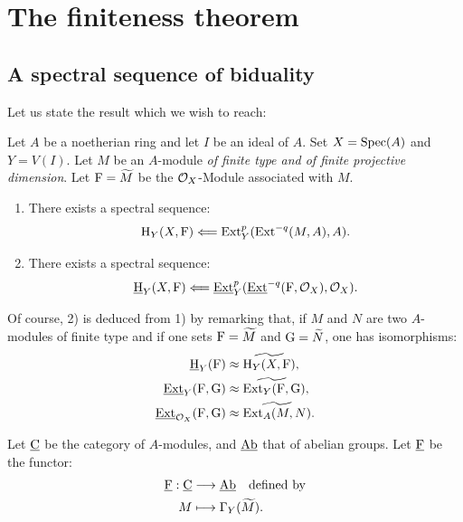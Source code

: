 \chapter{The finiteness theorem} \label{VIII}

\section[A spectral sequence of biduality]
{A spectral sequence of biduality\protect\sfootnotemark}\label{VIII.1}

\renewcommand{\theequation}{\thesection.\arabic{equation}}

Let us state the result which we wish to reach:

\begin{proposition} \label{VIII.1.1} Let $A$ be a noetherian ring and let $I$ be an ideal of $A$. Set $X=\operatorname{Spec}(A)$ and $Y=V(I)$. Let $M$ be an $A$-module \emph{of finite type and of finite projective dimension}. Let ${\operatorname{F}}=\widetilde{M}$ be the $\mathcal{O}_X$-Module associated with $M$.
\begin{enumerate}
\item[\textup{1)}] There exists a spectral sequence:
\[
\operatorname{H}_Y(X, {\operatorname{F}}) \Longleftarrow \operatorname{Ext}^p_Y(\operatorname{Ext}^{-q}(M, A), A).
\]

\item[\textup{2)}] There exists a spectral sequence:
\[
\operatorname{\underline{H}}_Y(X, {\operatorname{F}}) \Longleftarrow \operatorname{\underline{Ext}}^p_Y(\operatorname{\underline{Ext}}^{-q}({\operatorname{F}}, \mathcal{O}_X), \mathcal{O}_X).
\]
\end{enumerate}
\end{proposition}

Of course, 2) is deduced from 1) by remarking that, if $M$ and $N$ are two $A$-modules of finite type and if one sets ${{\operatorname{F}}}=\widetilde{M}$ and ${{\operatorname{G}}}=\widetilde{N}$, one has isomorphisms:
\begin{align*}
\operatorname{\underline{H}}_Y({\operatorname{F}}) &\approx \widetilde{\operatorname{H}_Y(X, {\operatorname{F}})}, \\
\operatorname{\underline{Ext}}_Y({\operatorname{F}}, {\operatorname{G}}) &\approx \widetilde{\operatorname{Ext}_Y({\operatorname{F}}, {\operatorname{G}}}), \\
\operatorname{\underline{Ext}}_{\mathcal{O}_X}({\operatorname{F}}, {\operatorname{G}}) &\approx \widetilde{\operatorname{Ext}_A(M, N)}.
\end{align*}

Let $\underline{\mathrm{C}}$ be the category of $A$-modules, and $\underline{\mathrm{Ab}}$ that of abelian groups. Let ${\underline{\mathrm{F}}}$ be the functor:
\begin{align*}
\cF: \ccat&\to \Ab \quad\text{defined by} \\
 M &\mto \Gamma_Y(\widetilde{M}).
\end{align*}

